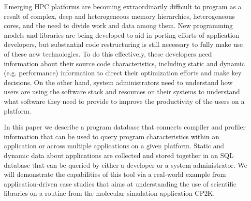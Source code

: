 Emerging HPC platforms are becoming extraordinarily difficult to program as a result of complex, deep and heterogeneous memory hierarchies, heterogeneous cores, and the need to divide work and data among them.
New programming models and libraries are being developed to aid in porting efforts of application developers, but substantial code restructuring is still necessary to fully make use of these new technologies.
To do this effectively, these developers need information about their source code characteristics, including static and dynamic (e.g. performance) information to direct their optimization efforts and make key decisions.
On the other hand, system administrators need to understand how users are using the software stack and resources on their systems to understand what software they need to provide to improve the productivity of the users on a platform.

In this paper we describe a program database that connects compiler and profiler information that can be used to query program characteristics within an application or across multiple applications on a given platform.
Static and dynamic data about applications are collected and stored together in an \acs{SQL} database that can be queried by either a developer or a system administrator.
We will demonstrate the capabilities of this tool via a real-world example from application-driven case studies that aims at understanding the use of scientific libraries on a routine from the molecular simulation application CP2K.
